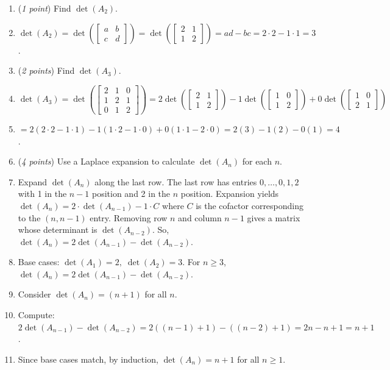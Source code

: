 \documentclass[11pt]{article}
\theoremstyle{definition}
\numberwithin{equation}{subsection}
\begin{document}
\begin{enumerate}
\begin{enumerate}
\item (\emph{1 point}) Find $\det(A_2)$.
\item[] $\det(A_2)=\det(\begin{bmatrix}
    a&b\\c&d
\end{bmatrix})=\det(\begin{bmatrix}
    2&1\\1&2
\end{bmatrix})=ad-bc=2\cdot2-1\cdot1=3$.
\item (\emph{2 points})  Find $\det(A_3)$.
\item[] $\det(A_3)=\det(\begin{bmatrix}
    2&1&0\\1&2&1\\0&1&2
\end{bmatrix})=2\det(\begin{bmatrix}
    2&1\\1&2
\end{bmatrix})-1\det(\begin{bmatrix}
    1&0\\1&2
\end{bmatrix})+0\det(\begin{bmatrix}
    1&0\\2&1
\end{bmatrix})$
\item[] $=2(2\cdot2-1\cdot1)-1(1\cdot2-1\cdot0)+0(1\cdot1-2\cdot0)=2(3)-1(2)-0(1)=4$.
\item (\emph{4 points}) Use a Laplace expansion to calculate $\det(A_n)$ for each $n$.
\item[] Expand $\det(A_n)$ along the last row. The last row has entries $0,\ldots,0,1,2$ with 1 in the $n-1$ position and 2 in the $n$ position. Expansion yields $\det(A_n)=2\cdot\det(A_{n-1})-1\cdot C$ where $C$ is the cofactor corresponding to the $(n,n-1)$ entry. Removing row $n$ and column $n-1$ gives a matrix whose determinant is $\det(A_{n-2})$. So, $\det(A_n)=2\det(A_{n-1})-\det(A_{n-2})$.
\item[] Base cases: $\det(A_1)=2,\; \det(A_2)=3$. For $n\geq3$, $\det(A_n)=2\det(A_{n-1})-\det(A_{n-2})$. 
\item[] Consider $\det(A_n)=(n+1)$ for all $n$. 
\item[] Compute: $2\det(A_{n-1})-\det(A_{n-2})=2((n-1)+1)-((n-2)+1)=2n-n+1=n+1$.
\item[] Since base cases match, by induction, $\det(A_n)=n+1$ for all $n\geq1$.
\end{enumerate}


\end{enumerate}
\end{document}
